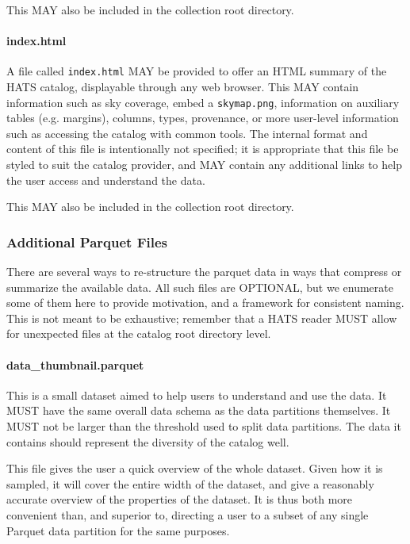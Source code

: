 \documentclass[11pt,a4paper]{ivoa}
\begin{document}
This MAY also be included in the collection root directory.

\paragraph{index.html}

A file called \texttt{index.html} MAY be provided to offer an HTML summary of the HATS catalog, displayable through any web browser.
This MAY contain information such as sky coverage, embed a \texttt{skymap.png}, information on auxiliary tables (e.g. margins), columns, types, 
provenance, or more user-level information such as accessing the catalog with common tools. 
The internal format and content of this file is intentionally not specified; it is appropriate that this file be styled to suit the catalog provider, and MAY contain any additional links to help the user access and understand the data.

This MAY also be included in the collection root directory.


\subsubsection{Additional Parquet Files}

There are several ways to re-structure the parquet data in ways that compress or summarize the available data.
All such files are OPTIONAL, but we enumerate some of them here to provide motivation, and a framework for consistent naming.
This is not meant to be exhaustive; remember that a HATS reader MUST allow for unexpected files at the catalog root directory level.

\paragraph{data\_thumbnail.parquet} 
This is a small dataset aimed to help users to understand and use the data. 
It MUST have the same overall data schema as the data partitions themselves.
It MUST not be larger than the threshold used to split data partitions.
The data it contains should represent the diversity of the catalog well. \par

This file gives the user a quick overview of the whole dataset.
Given how it is sampled, it will cover the entire width of the dataset, and give a reasonably accurate overview of the properties of the dataset. 
It is thus both more convenient than, and superior to, directing a user to a subset of any single Parquet data partition for the same purposes.
\end{document}
